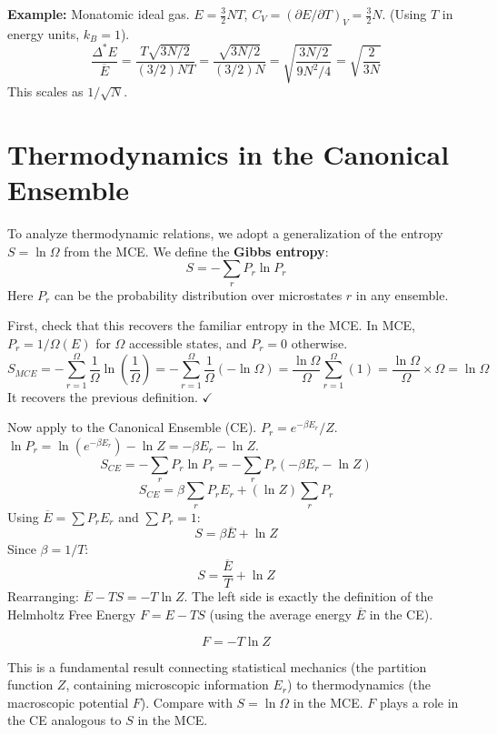 \documentclass[11pt]{article}
\newcommand{\avg}[1]{\overline{#1}}
\begin{document}
\textbf{Example:} Monatomic ideal gas.
$E = \frac{3}{2} N T$, $C_V = (\partial E/\partial T)_V = \frac{3}{2} N$. (Using $T$ in energy units, $k_B=1$).
\[ \frac{\Delta^* E}{\avg{E}} = \frac{T \sqrt{3N/2}}{(3/2)NT} = \frac{\sqrt{3N/2}}{(3/2)N} = \sqrt{\frac{3N/2}{9N^2/4}} = \sqrt{\frac{2}{3N}} \]
This scales as $1/\sqrt{N}$.

\section*{Thermodynamics in the Canonical Ensemble}

To analyze thermodynamic relations, we adopt a generalization of the entropy $S=\ln \Omega$ from the MCE. We define the \textbf{Gibbs entropy}:
\[ S = -\sum_r P_r \ln P_r \]
Here $P_r$ can be the probability distribution over microstates $r$ in any ensemble.

First, check that this recovers the familiar entropy in the MCE.
In MCE, $P_r = 1/\Omega(E)$ for $\Omega$ accessible states, and $P_r=0$ otherwise.
\[ S_{MCE} = -\sum_{r=1}^{\Omega} \frac{1}{\Omega} \ln\left(\frac{1}{\Omega}\right) = -\sum_{r=1}^{\Omega} \frac{1}{\Omega} (-\ln \Omega) = \frac{\ln \Omega}{\Omega} \sum_{r=1}^{\Omega} (1) = \frac{\ln \Omega}{\Omega} \times \Omega = \ln \Omega \]
It recovers the previous definition. $\checkmark$

Now apply to the Canonical Ensemble (CE). $P_r = e^{-\beta E_r} / Z$.
$\ln P_r = \ln(e^{-\beta E_r}) - \ln Z = -\beta E_r - \ln Z$.
\[ S_{CE} = -\sum_r P_r \ln P_r = -\sum_r P_r (-\beta E_r - \ln Z) \]
\[ S_{CE} = \beta \sum_r P_r E_r + (\ln Z) \sum_r P_r \]
Using $\avg{E} = \sum P_r E_r$ and $\sum P_r = 1$:
\[ S = \beta \avg{E} + \ln Z \]
Since $\beta = 1/T$:
\[ S = \frac{\avg{E}}{T} + \ln Z \]
Rearranging: $\avg{E} - TS = -T \ln Z$.
The left side is exactly the definition of the Helmholtz Free Energy $F = E - TS$ (using the average energy $\avg{E}$ in the CE).
\begin{eqbox}
\[ F = -T \ln Z \]
\end{eqbox}
This is a fundamental result connecting statistical mechanics (the partition function $Z$, containing microscopic information $E_r$) to thermodynamics (the macroscopic potential $F$).
Compare with $S = \ln \Omega$ in the MCE. $F$ plays a role in the CE analogous to $S$ in the MCE.
\end{document}
